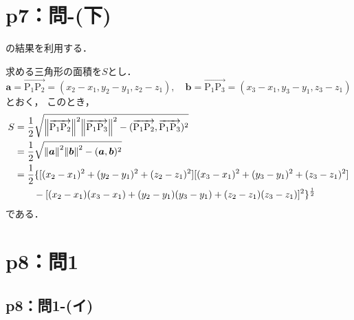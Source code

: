 \documentclass[a4paper,10pt,fleqn]{ltjsarticle}
\begin{document}
\section*{p7：問-(下)}
\begin{tleftbar}
    [1.4]の結果を利用する．

    求める三角形の面積を$S$とし．
    \[
        \bm{a}=\overrightarrow{\mathrm{P_1 P_2}}=(x_2-x_1,y_2-y_1,z_2-z_1),\quad \bm{b}=\overrightarrow{\mathrm{P_1 P_3}}=(x_3-x_1,y_3-y_1,z_3-z_1)
    \]
    とおく，
    このとき，
    \begin{align*}
        S & = \frac{1}{2} \sqrt{\norm{\overrightarrow{\mathrm{P_1 P_2}}}^2 \norm{\overrightarrow{\mathrm{P_1 P_3}}}^2 - (\overrightarrow{\mathrm{P_1 P_2}}, \overrightarrow{\mathrm{P_1 P_3}})^2} \\
          & = \frac{1}{2} \sqrt{\norm{\bm{a}}^2 \norm{\bm{b}}^2 - (\bm{a},\bm{b})^2 }                                                                                                             \\
          & = \frac{1}{2} \{ \lbrack (x_2 - x_1)^2+(y_2-y_1)^2+ (z_2 - z_1)^2 \rbrack \lbrack (x_3 - x_1)^2+(y_3-y_1)^2+ (z_3 - z_1)^2 \rbrack                                                    \\
          & \qquad - \lbrack (x_2-x_1)(x_3-x_1)+(y_2 -y_1)(y_3-y_1)+(z_2-z_1)(z_3-z_1)\rbrack ^2\}^{\frac{1}{2}}
    \end{align*}
    である．
\end{tleftbar}

\newpage

\section*{p8：問1}


\subsection*{p8：問1-(イ)}
\end{document}
